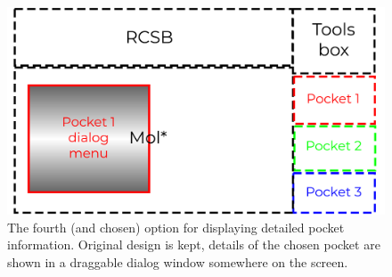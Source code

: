 \begin{figure}[htb]
	\centering
	\includegraphics[width=\linewidth]{img/dialog_4-svg.pdf}
	\caption{The fourth (and chosen) option for displaying detailed pocket information. Original design is kept, details of the chosen pocket are shown in a draggable dialog window somewhere on the screen.}
	\label{fig:dialog-4}
\end{figure}
